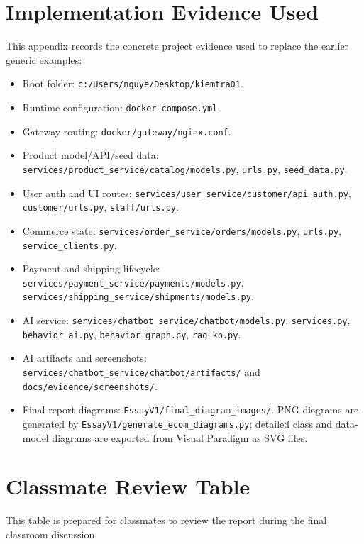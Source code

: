 \documentclass[12pt,a4paper]{article}
\newcommand{\codepath}[1]{{\small\texttt{#1}}}
\begin{document}
\appendix

\section{Implementation Evidence Used}

This appendix records the concrete project evidence used to replace the earlier generic examples:

\begin{itemize}
    \item Root folder: \codepath{c:/Users/nguye/Desktop/kiemtra01}.
    \item Runtime configuration: \codepath{docker-compose.yml}.
    \item Gateway routing: \codepath{docker/gateway/nginx.conf}.
    \item Product model/API/seed data: \codepath{services/product\_service/catalog/models.py}, \codepath{urls.py}, \codepath{seed\_data.py}.
    \item User auth and UI routes: \codepath{services/user\_service/customer/api\_auth.py}, \codepath{customer/urls.py}, \codepath{staff/urls.py}.
    \item Commerce state: \codepath{services/order\_service/orders/models.py}, \codepath{urls.py}, \codepath{service\_clients.py}.
    \item Payment and shipping lifecycle: \codepath{services/payment\_service/payments/models.py}, \codepath{services/shipping\_service/shipments/models.py}.
    \item AI service: \codepath{services/chatbot\_service/chatbot/models.py}, \codepath{services.py}, \codepath{behavior\_ai.py}, \codepath{behavior\_graph.py}, \codepath{rag\_kb.py}.
    \item AI artifacts and screenshots: \codepath{services/chatbot\_service/chatbot/artifacts/} and \codepath{docs/evidence/screenshots/}.
    \item Final report diagrams: \codepath{EssayV1/final\_diagram\_images/}. PNG diagrams are generated by \codepath{EssayV1/generate\_ecom\_diagrams.py}; detailed class and data-model diagrams are exported from Visual Paradigm as SVG files.
\end{itemize}

\clearpage
\section{Classmate Review Table}

This table is prepared for classmates to review the report during the final classroom discussion.
\end{document}

